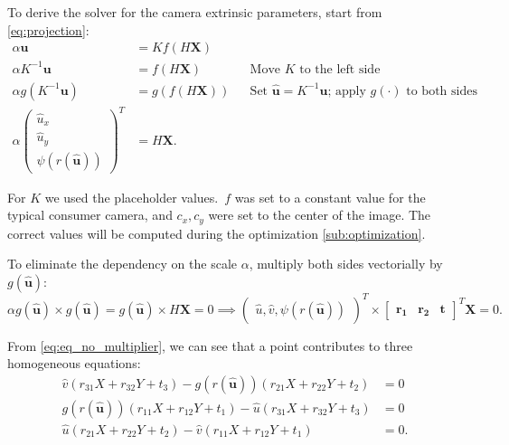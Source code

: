 To derive the solver for the camera extrinsic parameters, start from
\cref{eq:projection}:
\begin{align}
	\alpha \mathbf{u}                                                          & = K f(H\mathbf{X})       \\
	\alpha K^{-1} \mathbf{u}                                                   & = f(H\mathbf{X})    &  &
	\text{Move \(K\) to the left side}                                                                    \\
	\alpha g( K^{-1}\mathbf{u})                                                & = g(f(H\mathbf{X})) &  &
	\text{Set \(\mathbf{\widehat{u}} = K^{-1}\mathbf{u}\); apply \(g(\cdot)\) to both sides}              \\
	\alpha \begin{pmatrix}
		       \widehat{u}_x \\ \widehat{u}_y \\ \psi(r(\mathbf{\widehat{u}}))
	       \end{pmatrix}^{T} & = H\mathbf{X}.
\end{align}

For \(K\) we used the placeholder values.\ \(f\) was set to a constant value for
the typical consumer camera, and \(c_x, c_y\) were set to the center of the
image.
The correct values will be computed during the optimization \cref{sub:optimization}.

To eliminate the dependency on the scale \(\alpha\), multiply both sides
vectorially by \(g(\mathbf{\widehat{u}})\):
\begin{equation}
	\alpha g(\mathbf{\widehat{u}}) \times g(\mathbf{\widehat{u}})
	= g(\mathbf{\widehat{u}}) \times H\mathbf{X}
	= 0 \implies
	\begin{pmatrix}
		\widehat{u}, \widehat{v}, \psi(r(\mathbf{\widehat{u}}))
	\end{pmatrix}^{T} \times \begin{bmatrix}
		\mathbf{r_1} & \mathbf{r_2} & \mathbf{t}
	\end{bmatrix}^{T} \mathbf{X} = 0
	\label{eq:eq_no_multiplier}.
\end{equation}

From \cref{eq:eq_no_multiplier}, we can see that a point contributes to three
homogeneous equations:
\begin{align}
	\widehat{v} (r_{31}X + r_{32} Y + t_3) -
	g(r(\mathbf{\widehat{u}})) (r_{21}X + r_{22}Y + t_2 ) & = 0
	\label{eq:scaramuzza_system_1}                              \\
	g(r(\mathbf{\widehat{u}})) (r_{11}X + r_{12}Y + t_1) -
	\widehat{u} (r_{31}X + r_{32} Y + t_3)                      & = 0
	\label{eq:scaramuzza_system_2}                              \\
	\widehat{u} (r_{21}X + r_{22}Y + t_2 ) -
	\widehat{v} (r_{11}X + r_{12}Y + t_1)                 & = 0
	\label{eq:scaramuzza_system_3}.
\end{align}

